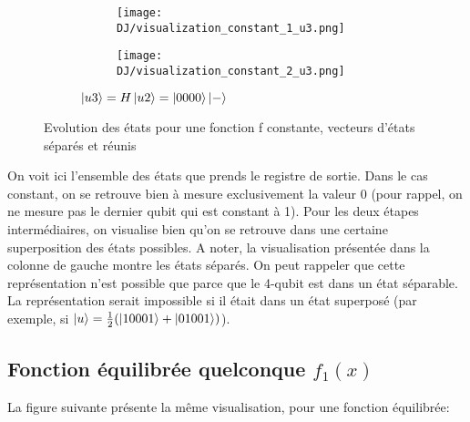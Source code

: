 \begin{figure}[ht]
  \begin{subfigure}{0.8\textwidth}
    \centering
    \begin{subfigure}[b]{0.6\textwidth}
      \centering
      \texttt{[image: DJ/visualization\_constant\_1\_u3.png]}
    \end{subfigure}
    \begin{subfigure}[b]{0.25\textwidth}
      \centering
      \texttt{[image: DJ/visualization\_constant\_2\_u3.png]}
    \end{subfigure}
    \caption{$\ket{u3}=H\ket{u2}= \ket{0000}\ket{-}$}
  \end{subfigure}

  \caption{Evolution des états pour une fonction f constante, vecteurs d'états séparés et réunis}
\end{figure}

On voit ici l'ensemble des états que prends le registre de sortie. Dans le cas constant, on se retrouve bien à mesure exclusivement la valeur 0 (pour rappel, on ne mesure pas le dernier qubit qui est constant à 1). Pour les deux étapes intermédiaires, on visualise bien qu'on se retrouve dans une certaine superposition des états possibles. A noter, la visualisation présentée dans la colonne de gauche montre les états séparés. On peut rappeler que cette représentation n'est possible que parce que le 4-qubit est dans un état séparable. La représentation serait impossible si il était dans un état superposé (par exemple, si $\ket{u} = \frac{1}{2}(\ket{10001} + \ket{01001})$).

\subsection{Fonction équilibrée quelconque $f_1(x)$}
La figure suivante présente la même visualisation, pour une fonction équilibrée:

